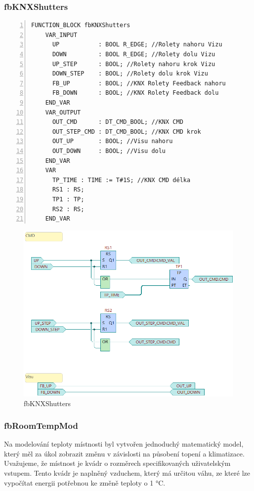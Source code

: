 \subsubsection{fbKNXShutters}
\begin{lstlisting}[language=ST, breaklines=true, numbers=left, numberstyle=\small, numbersep=10pt, frame=single, basicstyle=\ttfamily\small, caption={Definice funkčního bloku fbKNXShutters}, label={lst:fbKNXShutters}]
    FUNCTION_BLOCK fbKNXShutters
    VAR_INPUT
      UP           : BOOL R_EDGE; //Rolety nahoru Vizu
      DOWN         : BOOL R_EDGE; //Rolety dolu Vizu
      UP_STEP      : BOOL; //Rolety nahoru krok Vizu
      DOWN_STEP    : BOOL; //Rolety dolu krok Vizu
      FB_UP        : BOOL; //KNX Rolety Feedback nahoru
      FB_DOWN      : BOOL; //KNX Rolety Feedback dolu
    END_VAR
    VAR_OUTPUT
      OUT_CMD      : DT_CMD_BOOL; //KNX CMD
      OUT_STEP_CMD : DT_CMD_BOOL; //KNX CMD krok
      OUT_UP       : BOOL; //Visu nahoru
      OUT_DOWN     : BOOL; //Visu dolu
    END_VAR
    VAR
      TP_TIME : TIME := T#1S; //KNX CMD délka
      RS1 : RS;
      TP1 : TP;
      RS2 : RS;
    END_VAR
\end{lstlisting}

\begin{figure}[!ht]
    \begin{center}
        \includegraphics[scale=0.7]{obrazky/fbKNXShutters.png}
    \end{center}
    \caption[fbKNXShutters]{fbKNXShutters}
    \label{fig:fbKNXShutters}
\end{figure}
\subsubsection{fbRoomTempMod}
Na modelování teploty místnosti byl vytvořen jednoduchý matematický model, který měl za úkol zobrazit změnu v závislosti na působení topení a klimatizace. Uvažujeme, že místnost je kvádr o rozměrech specifikovaných uživatelským vstupem. Tento kvádr je naplněný vzduchem, který má určitou váhu, ze které lze vypočítat energii potřebnou ke změně teploty o 1 °C.

